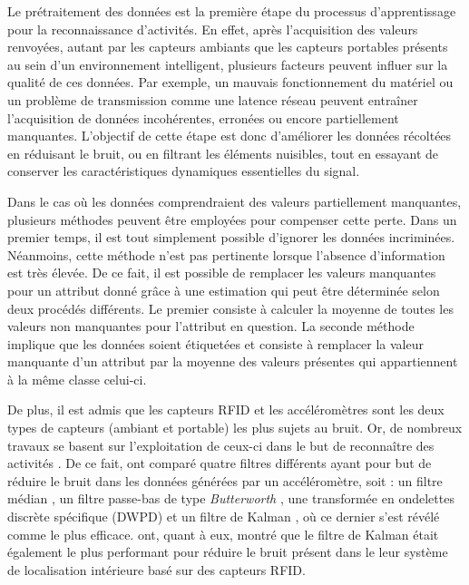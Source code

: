 Le prétraitement des données est la première étape du processus d'apprentissage pour la reconnaissance d'activités. En effet, après l'acquisition des valeurs renvoyées, autant par les capteurs ambiants que les capteurs portables présents au sein d'un environnement intelligent, plusieurs facteurs peuvent influer sur la qualité de ces données. Par exemple, un mauvais fonctionnement du matériel ou un problème de transmission comme une latence réseau peuvent entraîner l'acquisition de données incohérentes, erronées ou encore partiellement manquantes. L'objectif de cette étape est donc d'améliorer les données récoltées en réduisant le bruit, ou en filtrant les éléments nuisibles, tout en essayant de conserver les caractéristiques dynamiques essentielles du signal.

Dans le cas où les données comprendraient des valeurs partiellement manquantes, plusieurs méthodes peuvent être employées pour compenser cette perte. Dans un premier temps, il est tout simplement possible d'ignorer les données incriminées. Néanmoins, cette méthode n'est pas pertinente lorsque l'absence d'information est très élevée. De ce fait, il est possible de remplacer les valeurs manquantes pour un attribut donné grâce à une estimation qui peut être déterminée selon deux procédés différents. Le premier consiste à calculer la moyenne de toutes les valeurs non manquantes pour l'attribut en question. La seconde méthode implique que les données soient étiquetées et consiste à remplacer la valeur manquante d'un attribut par la moyenne des valeurs présentes qui appartiennent à la même classe celui-ci.

De plus, il est admis que les capteurs \ac{RFID} et les accéléromètres sont les deux types de capteurs (ambiant et portable) les plus sujets au bruit. Or, de nombreux travaux se basent sur l'exploitation de ceux-ci dans le but de reconnaître des activités \citep{Ravi2005, Stikic2008, Buettner2009, Khan2011, Mannini2017}. De ce fait, \cite{Wang2011} ont comparé quatre filtres différents ayant pour but de réduire le bruit dans les données générées par un accéléromètre, soit : un filtre médian \citep{Huang1979}, un filtre passe-bas de type \textit{Butterworth} \citep{Butterworth1930}, une transformée en ondelettes discrète spécifique (\ac{DWPD}) \citep{Mallat1989} et un filtre de Kalman \citep{Welch2006}, où ce dernier s'est révélé comme le plus efficace. \cite{Abreu2014} ont, quant à eux, montré que le filtre de Kalman était également le plus performant pour réduire le bruit présent dans le leur système de localisation intérieure basé sur des capteurs \acs{RFID}.

